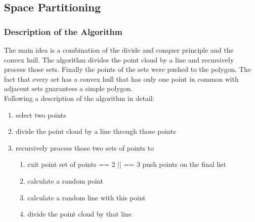 \subsection{Space Partitioning}
\subsubsection{Description of the Algorithm}
The main idea is a combination of the divide and conquer principle and
the convex hull. The algorithm divides the point cloud by a line and
recursively process those sets. Finally the points of the sets were
pushed to the polygon. The fact that every set has a convex hull that
has only one point in common with adjacent sets guarantees a simple
polygon.
\\[12pt]
Following a description of the algorithm in detail:

\begin{enumerate}
  \item select two points
  \item divide the point cloud by a line through those points 
  \item recursively process those two sets of points  to 
  \begin{enumerate}
    \item exit point set of points == 2 || == 3 push points on the final list
    \item calculate a random point
    \item calculate a random line with this point
    \item divide the point cloud by that line
  \end{enumerate}
\end{enumerate}

